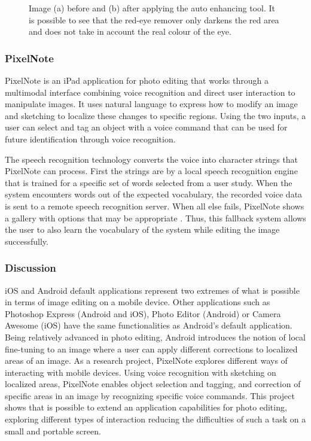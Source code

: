 \begin{figure}[htbp]
        \centering
  \caption{Image (a) before and (b) after applying the auto enhancing tool. It is possible to see that the red-eye remover only darkens the red area and does not take in account the real colour of the eye.}
  \label{fig:ios_edit_image}
\end{figure}

\subsubsection{PixelNote}

PixelNote \cite{linder2013pixeltone} is an iPad application for photo editing that works through a multimodal interface combining voice recognition and direct user interaction to manipulate images. It uses natural language to express how to modify an image and sketching to localize these changes to specific regions. Using the two inputs, a user can select and tag an object with a voice command that can be used for future identification through voice recognition.

The speech recognition technology converts the voice into character strings that PixelNote can process. First the strings are by a local speech recognition engine that is trained for a specific set of words selected from a user study. When the system encounters words out of the expected vocabulary, the recorded voice data is sent to a remote speech recognition server. When all else fails, PixelNote shows a gallery with options that may be appropriate . Thus, this fallback system allows the user to also learn the vocabulary of the system while editing the image successfully.

\subsubsection{Discussion}

iOS and Android default applications represent two extremes of what is possible in terms of image editing on a mobile device. Other applications such as Photoshop Express (Android and iOS), Photo Editor (Android) or Camera Awesome (iOS) have the same functionalities as Android's default application. Being relatively advanced in photo editing, Android introduces the notion of local fine-tuning to an image where a user can apply different corrections to localized areas of an image.
As a research project, PixelNote explores different ways of interacting with mobile devices. Using voice recognition with sketching on localized areas, PixelNote enables object selection and tagging, and correction of specific areas in an image by recognizing specific voice commands. This project shows that is possible to extend an application capabilities for photo editing, exploring different types of interaction reducing the difficulties of such a task on a small and portable screen.


